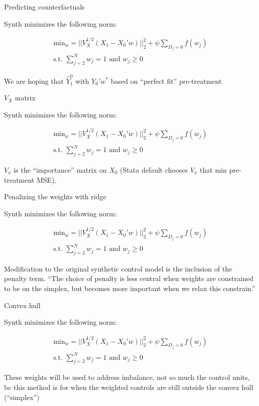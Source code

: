 \documentclass{beamer}
\begin{document}
\begin{frame}{Predicting counterfactuals}

Synth minimizes the following norm:

\begin{eqnarray*}
\textrm{min}_w = || V_X^{1/2} (X_1 - X_0'w) ||_2^2 + \psi \sum_{D_j=0}f(w_j)\\
\textrm{s.t. }\sum_{j=2}^N w_{j} =1 \textrm{ and } w_j \geq 0
\end{eqnarray*}

We are hoping that $\widehat{Y}_1^0$ with $Y_0' {w}^{*}$ based on ``perfect fit'' pre-treatment

\end{frame}




\begin{frame}{$V_X$ matrix}

Synth minimizes the following norm:

\begin{eqnarray*}
\textrm{min}_w = || V_X^{1/2} (X_1 - X_0'w) ||_2^2 + \psi \sum_{D_j=0}f(w_j)\\
\textrm{s.t. }\sum_{j=2}^N w_{j} =1 \textrm{ and } w_j \geq 0
\end{eqnarray*}

$V_x$ is the ``importance'' matrix on $X_0$ (Stata default chooses $V_x$ that min pre-treatment MSE).
\end{frame}

\begin{frame}{Penalizing the weights with ridge}

Synth minimizes the following norm:

\begin{eqnarray*}
\textrm{min}_w = || V_X^{1/2} (X_1 - X_0'w) ||_2^2 + \psi \sum_{D_j=0}f(w_j)\\
\textrm{s.t. }\sum_{j=2}^N w_{j} =1 \textrm{ and } w_j \geq 0
\end{eqnarray*}

Modification to the original synthetic control model is the inclusion of the penalty term. ``The choice of penalty is less central when weights are constrained to be on the simplex, but becomes more important when we relax this constrain.''

\end{frame}

\begin{frame}{Convex hull}

Synth minimizes the following norm:

\begin{eqnarray*}
\textrm{min}_w = || V_X^{1/2} (X_1 - X_0'w) ||_2^2 + \psi \sum_{D_j=0}f(w_j)\\
\textrm{s.t. }\sum_{j=2}^N w_{j} =1 \textrm{ and } w_j \geq 0
\end{eqnarray*}

These weights will be used to address imbalance, not so much the control units, bc this method is for when the weighted controls are still outside the convex hull (``simplex'')

\end{frame}
\end{document}
